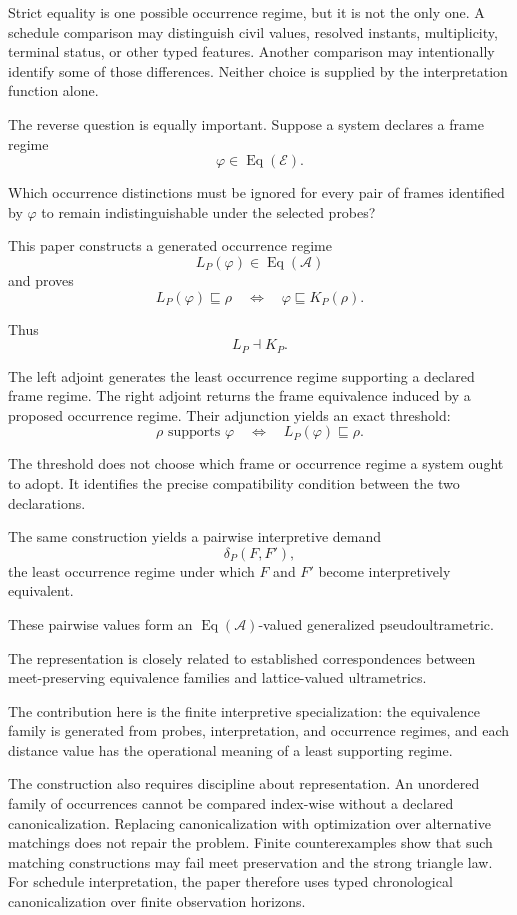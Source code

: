 \documentclass[11pt]{article}
\theoremstyle{plain}
\theoremstyle{definition}
\theoremstyle{remark}
\begin{document}
Strict equality is one possible occurrence regime,
but it is not the only one.
A schedule comparison may distinguish
civil values,
resolved instants,
multiplicity,
terminal status,
or other typed features.
Another comparison may intentionally identify some of those differences.
Neither choice is supplied by the interpretation function alone.

The reverse question is equally important.
Suppose a system declares
a frame regime
\[
  \varphi
  \in
  \operatorname{Eq}(\mathcal{E}).
\]

Which occurrence distinctions
must be ignored
for every pair of frames
identified by \(\varphi\)
to remain indistinguishable
under the selected probes?

This paper constructs
a generated occurrence regime
\[
  L_P(\varphi)
  \in
  \operatorname{Eq}(\mathcal{A})
\]
and proves
\[
  L_P(\varphi)
  \sqsubseteq
  \rho
  \quad\Longleftrightarrow\quad
  \varphi
  \sqsubseteq
  K_P(\rho).
\]

Thus
\[
  L_P
  \dashv
  K_P.
\]

The left adjoint generates the least occurrence regime
supporting a declared frame regime.
The right adjoint returns the frame equivalence
induced by a proposed occurrence regime.
Their adjunction yields an exact threshold:
\[
  \rho
  \text{ supports }
  \varphi
  \quad\Longleftrightarrow\quad
  L_P(\varphi)
  \sqsubseteq
  \rho.
\]

The threshold does not choose which frame or occurrence regime
a system ought to adopt.
It identifies the precise compatibility condition between the two declarations.

The same construction yields a pairwise interpretive demand
\[
  \delta_P(F,F'),
\]
the least occurrence regime under which
\(F\) and \(F'\)
become interpretively equivalent.

These pairwise values form an
\(\operatorname{Eq}(\mathcal{A})\)-valued
generalized pseudoultrametric.

The representation is closely related to established correspondences
between meet-preserving equivalence families and lattice-valued ultrametrics.

The contribution here is the finite interpretive specialization:
the equivalence family is generated from
probes,
interpretation,
and occurrence regimes,
and each distance value
has the operational meaning
of a least supporting regime.

The construction also requires discipline about representation.
An unordered family of occurrences cannot be compared index-wise
without a declared canonicalization.
Replacing canonicalization with optimization over alternative matchings
does not repair the problem.
Finite counterexamples show that such matching constructions
may fail meet preservation and the strong triangle law.
For schedule interpretation, the paper therefore uses
typed chronological canonicalization over finite observation horizons.
\end{document}
